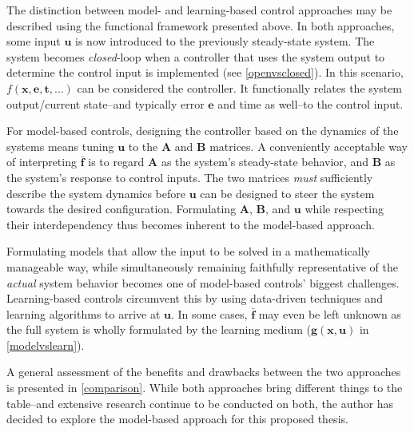 

The distinction between model- and learning-based control approaches may be described using the functional framework presented above. In both approaches, some input $\mathbf{u}$ is now introduced to the previously steady-state system. The system becomes \textit{closed}-loop when a controller that uses the system output to determine the control input is implemented (see \autoref{openvsclosed}). %
In this scenario, $f(\mathbf{x,e,t,...})$ can be considered the controller. It functionally relates the system output/current state--and typically error $\mathbf{e}$ and time as well--to the control input. 



For model-based controls, designing the controller based on the dynamics of the systems means tuning $\mathbf{u}$ to the $\mathbf{A}$ and $\mathbf{B}$ matrices. A conveniently acceptable way of interpreting $\mathbf{\bar{f}}$ is to regard $\mathbf{A}$ as the system's steady-state behavior, and $\mathbf{B}$ as the system's response to control inputs. The two matrices \textit{must} sufficiently describe the system dynamics before $\mathbf{u}$ can be designed to steer the system towards the desired configuration. Formulating $\mathbf{A}$, $\mathbf{B}$, and $\mathbf{u}$ while respecting their interdependency thus becomes inherent to the model-based approach.
  
Formulating models that allow the input to be solved in a mathematically manageable way, while simultaneously remaining faithfully representative of the \textit{actual} system behavior becomes one of model-based controls' biggest challenges. Learning-based controls circumvent this by using data-driven techniques and learning algorithms to arrive at $\mathbf{u}$. In some cases, $\mathbf{\bar{f}}$ may even be left unknown as the full system is wholly formulated by the learning medium ($\mathbf{g(x,u)}$ in \autoref{modelvslearn}).



A general assessment of the benefits and drawbacks between the two approaches is presented in \autoref{comparison}. While both approaches bring different things to the table--and extensive research continue to be conducted on both, the author has decided to explore the model-based approach for this proposed thesis.
